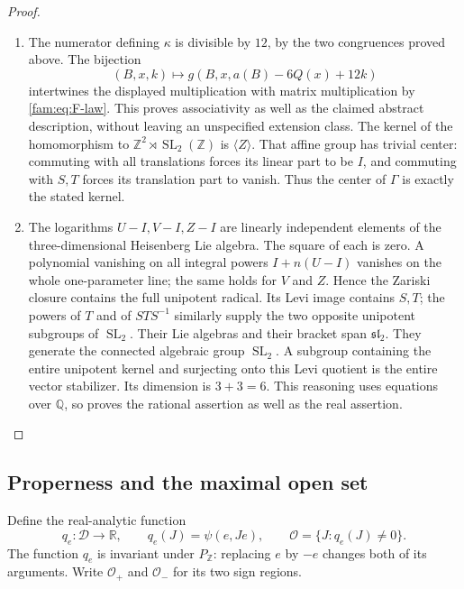 \begin{proof}
\begin{enumerate}[label=\arabic*.,leftmargin=*]
\item The numerator defining $\kappa$ is divisible by $12$, by the two
congruences proved above.  The bijection
\[
 (B,x,k)\longmapsto g(B,x,a(B)-6Q(x)+12k)
\]
intertwines the displayed multiplication with matrix multiplication by
\eqref{fam:eq:F-law}.  This proves associativity as well as the claimed abstract
description, without leaving an unspecified extension class.  The kernel
of the homomorphism to $\mathbb Z^2\rtimes\operatorname{SL}_2(\mathbb Z)$
is $\langle Z\rangle$.  That affine group has trivial center: commuting
with all translations forces its linear part to be $I$, and commuting
with $S,T$ forces its translation part to vanish.  Thus the center of
$\Gamma$ is exactly the stated kernel.

\item The logarithms $U-I,V-I,Z-I$ are linearly independent elements of the
three-dimensional Heisenberg Lie algebra.  The square of each is zero.
A polynomial vanishing on all integral powers $I+n(U-I)$ vanishes on
the whole one-parameter line; the same holds for $V$ and $Z$.  Hence the
Zariski closure contains the full unipotent radical.  Its Levi image
contains $S,T$; the powers of $T$ and of $STS^{-1}$ similarly supply the
two opposite unipotent subgroups of $\operatorname{SL}_2$.  Their Lie
algebras and their bracket span $\mathfrak{sl}_2$.  They generate the
connected algebraic group $\operatorname{SL}_2$.  A subgroup containing
the entire unipotent kernel and surjecting onto this Levi quotient is
the entire vector stabilizer.  Its dimension is $3+3=6$.  This reasoning
uses equations over $\mathbb Q$, so proves the rational assertion as
well as the real assertion.
\end{enumerate}
\end{proof}

\subsection{Properness and the maximal open set}\label{fam:section:F.2}

Define the real-analytic function
\[
 q_e:\mathcal D\longrightarrow\mathbb R,\qquad q_e(J)=\psi(e,Je),
 \qquad\mathcal O=\{J:q_e(J)\ne0\}.
\]
The function $q_e$ is invariant under $P_{\mathbb Z}$: replacing $e$ by
$-e$ changes both of its arguments.  Write $\mathcal O_+$ and
$\mathcal O_-$ for its two sign regions.

